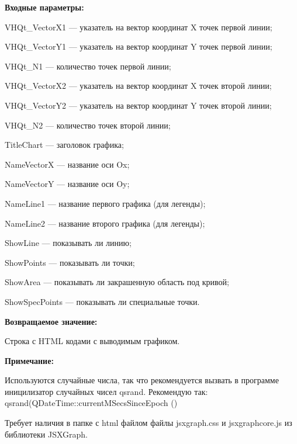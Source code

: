 \documentclass[a4paper,12pt]{article}
\begin{document}
\textbf{Входные параметры:}
 
    VHQt\_VectorX1 --- указатель на вектор координат X точек первой линии;
 
    VHQt\_VectorY1 --- указатель на вектор координат Y точек первой линии;
 
    VHQt\_N1 --- количество точек первой линии;
 
    VHQt\_VectorX2 --- указатель на вектор координат X точек второй линии;
 
    VHQt\_VectorY2 --- указатель на вектор координат Y точек второй линии;
 
    VHQt\_N2 --- количество точек второй линии;
 
    TitleChart --- заголовок графика;
 
    NameVectorX --- название оси Ox;
 
    NameVectorY --- название оси Oy;
 
    NameLine1 --- название первого графика (для легенды);
 
    NameLine2 --- название второго графика (для легенды);
 
    ShowLine --- показывать ли линию;
 
    ShowPoints --- показывать ли точки;
 
    ShowArea --- показывать ли закрашенную область под кривой;
 
    ShowSpecPoints --- показывать ли специальные точки.

\textbf{Возвращаемое значение:}

Строка с HTML кодами с выводимым графиком.

\textbf{Примечание:}

Используются случайные числа, так что рекомендуется вызвать в программе иницилизатор случайных чисел qsrand. Рекомендую так: qsrand(QDateTime::currentMSecsSinceEpoch () %

Требует наличия в папке с html файлом файлы jsxgraph.css и jsxgraphcore.js из библиотеки JSXGraph.
\end{document}
